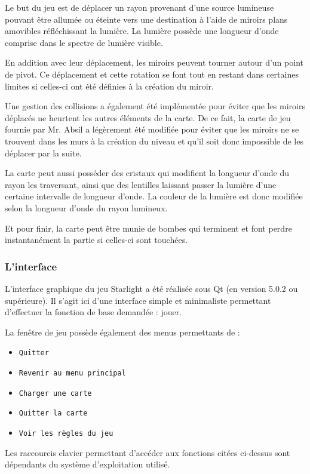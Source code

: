 \documentclass[]{article}
\begin{document}
Le but du jeu est de déplacer un rayon provenant d'une source lumineuse
pouvant être allumée ou éteinte
vers une destination à l'aide de miroirs plans amovibles réfléchissant
la lumière.
La lumière possède une longueur d'onde comprise dans le spectre
de lumière visible.

En addition avec leur déplacement, les miroirs peuvent tourner
autour d'un point de pivot.
Ce déplacement et cette rotation se font tout en restant
dans certaines limites si celles-ci ont été définies à la création du miroir.

Une gestion des collisions a également été implémentée pour
éviter que les miroirs déplacés ne heurtent les autres éléments de la carte.
De ce fait, la carte de jeu fournie par Mr. Absil a légèrement été modifiée
pour éviter que les miroirs ne se trouvent dans les murs à la création du niveau
et qu'il soit donc impossible de les déplacer par la suite.

La carte peut aussi posséder des cristaux qui modifient la longueur d'onde
du rayon les traversant, ainsi que des lentilles laissant passer la lumière
d'une certaine intervalle de longueur d'onde.
La couleur de la lumière est donc modifiée selon la longueur d'onde 
du rayon lumineux.

Et pour finir, la carte peut être munie de bombes qui terminent et font perdre
instantanément la partie si celles-ci sont touchées. 


\subsubsection{L'interface}

L'interface graphique du jeu Starlight a été réalisée sous Qt (en version 5.0.2 ou supérieure).
Il s'agit ici d'une interface simple et minimaliste permettant d'effectuer la fonction de base 
demandée : jouer.

La fenêtre de jeu possède également des menus permettants de :

\begin{itemize}
    \item \texttt{Quitter}
    \item \texttt{Revenir au menu principal}
    \item \texttt{Charger une carte}
    \item \texttt{Quitter la carte}
    \item \texttt{Voir les règles du jeu}
\end{itemize}

Les raccourcis clavier permettant d'accéder aux fonctions citées ci-dessus sont dépendants
du système d'exploitation utilisé.
\end{document}
